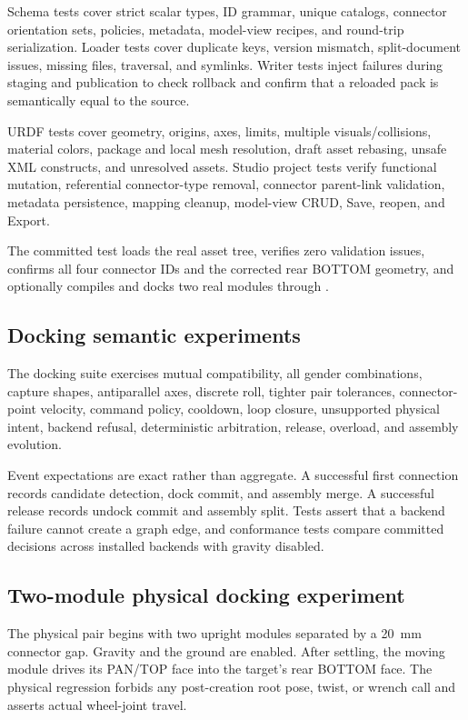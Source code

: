 Schema tests cover strict scalar types, ID grammar, unique catalogs, connector
orientation sets, policies, metadata, model-view recipes, and round-trip
serialization. Loader tests cover duplicate keys, version mismatch, split-document
issues, missing files, traversal, and symlinks. Writer tests inject failures during
staging and publication to check rollback and confirm that a reloaded pack is
semantically equal to the source.

URDF tests cover geometry, origins, axes, limits, multiple visuals/collisions, material
colors, package and local mesh resolution, draft asset rebasing, unsafe XML constructs,
and unresolved assets. Studio project tests verify functional mutation, referential
connector-type removal, connector parent-link validation, metadata persistence,
mapping cleanup, model-view CRUD, Save, reopen, and Export.

The committed \smoresep{} test loads the real asset tree, verifies zero validation
issues, confirms all four connector IDs and the corrected rear BOTTOM geometry, and
optionally compiles and docks two real modules through \mujoco{}.

\subsection{Docking semantic experiments}

The docking suite exercises mutual compatibility, all gender combinations, capture
shapes, antiparallel axes, discrete roll, tighter pair tolerances, connector-point
velocity, command policy, cooldown, loop closure, unsupported physical intent,
backend refusal, deterministic arbitration, release, overload, and assembly evolution.

Event expectations are exact rather than aggregate. A successful first connection
records candidate detection, dock commit, and assembly merge. A successful release
records undock commit and assembly split. Tests assert that a backend failure cannot
create a graph edge, and conformance tests compare committed decisions across installed
backends with gravity disabled.

\subsection{Two-module physical docking experiment}

The physical pair begins with two upright modules separated by a \SI{20}{mm} connector
gap. Gravity and the ground are enabled. After settling, the moving module drives its
PAN/TOP face into the target's rear BOTTOM face. The physical regression forbids any
post-creation root pose, twist, or wrench call and asserts actual wheel-joint travel.

